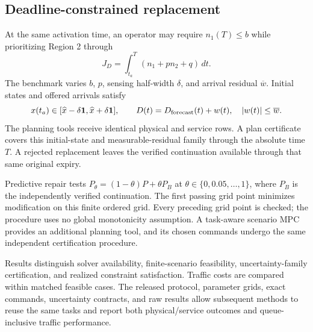\subsection{Deadline-constrained replacement}
At the same activation time, an operator may require $n_1(T)\le b$ while
prioritizing Region 2 through
\begin{equation}
 J_D=\int_{t_a}^{T}(n_1+p n_2+q)\,dt.
\end{equation}
The benchmark varies $b$, $p$, sensing half-width $\delta$, and arrival
residual $\overline w$. Initial states and offered arrivals satisfy
\begin{equation}
 x(t_a)\in[\widehat x-\delta\mathbf1,\widehat x+\delta\mathbf1],
 \qquad D(t)=D_{\rm forecast}(t)+w(t),\quad |w(t)|\le\overline w.
\end{equation}
The planning tools receive identical physical and service rows. A plan
certificate covers this initial-state and measurable-residual family through
the absolute time $T$. A rejected replacement leaves the verified
continuation available through that same original expiry.

Predictive repair tests $P_\theta=(1-\theta)P+\theta P_B$ at
$\theta\in\{0,0.05,\ldots,1\}$, where $P_B$ is the independently verified
continuation. The first passing grid point minimizes modification on this
finite ordered grid. Every preceding grid point is checked; the procedure
uses no global monotonicity assumption. A task-aware scenario MPC provides
an additional planning tool, and its chosen commands undergo the same
independent certification procedure.

Results distinguish solver availability, finite-scenario feasibility,
uncertainty-family certification, and realized constraint satisfaction.
Traffic costs are compared within matched feasible cases. The released
protocol, parameter grids, exact commands, uncertainty contracts, and raw
results allow subsequent methods to reuse the same tasks and report both
physical/service outcomes and queue-inclusive traffic performance.
